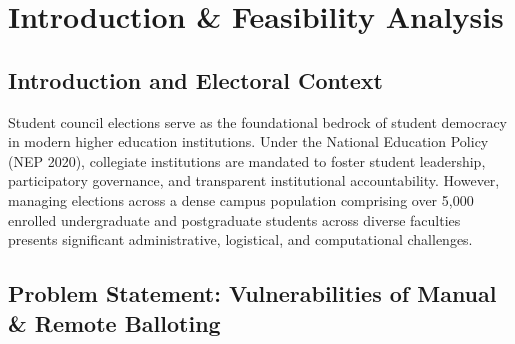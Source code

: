 \documentclass[12pt,a4paper,oneside]{report}
\begin{document}
\newpage

\tableofcontents
\listoftables
\listoffigures

\newpage
{}
\setcounter{page}{1}

\chapter{Introduction \& Feasibility Analysis}
\label{chap:intro_feasibility}

\section{Introduction and Electoral Context}
Student council elections serve as the foundational bedrock of student democracy in modern higher education institutions. Under the National Education Policy (NEP 2020), collegiate institutions are mandated to foster student leadership, participatory governance, and transparent institutional accountability. However, managing elections across a dense campus population comprising over 5,000 enrolled undergraduate and postgraduate students across diverse faculties presents significant administrative, logistical, and computational challenges.

\section{Problem Statement: Vulnerabilities of Manual \& Remote Balloting}
\end{document}

